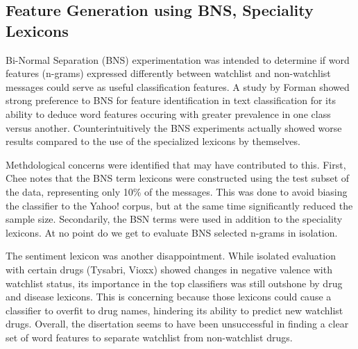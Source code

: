 \documentclass[twoside,11pt]{article}
\begin{document}
\subsection{Feature Generation using BNS, Speciality Lexicons}
Bi-Normal Separation (BNS) experimentation was intended to determine if word features (n-grams) expressed differently between watchlist and non-watchlist messages could serve as useful classification features. A study by Forman \citep{Forman} showed strong preference to BNS for feature identification in text classification for its ability to deduce word features occuring with greater prevalence in one class versus another. Counterintuitively the BNS experiments actually showed worse results compared to the use of the specialized lexicons by themselves.
\par Methdological concerns were identified that may have contributed to this. First, Chee notes that the BNS term lexicons were constructed using the test subset of the data, representing only 10\% of the messages. This was done to avoid biasing the classifier to the Yahoo! corpus, but at the same time significantly reduced the sample size. Secondarily, the BSN terms were used in addition to the speciality lexicons. At no point do we get to evaluate BNS selected n-grams in isolation.
\par The sentiment lexicon was another disappointment. While isolated evaluation with certain drugs (Tysabri, Vioxx) showed changes in negative valence with watchlist status, its importance in the top classifiers was still outshone by drug and disease lexicons. This is concerning because those lexicons could cause a classifier to overfit to drug names, hindering its ability to predict new watchlist drugs. Overall, the disertation seems to have been unsuccessful in finding a clear set of word features to separate watchlist from non-watchlist drugs.
\end{document}
